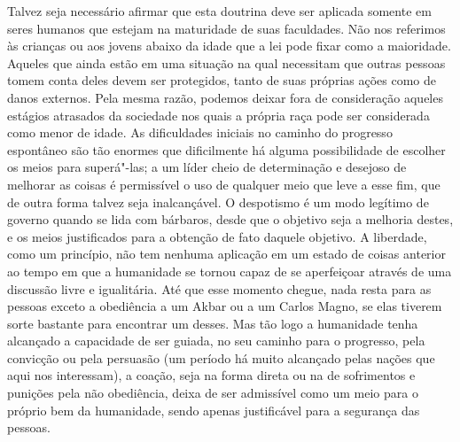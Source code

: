 Talvez seja necessário afirmar que esta doutrina deve ser
aplicada somente em seres humanos que estejam na maturidade de suas
faculdades. Não nos referimos às crianças ou aos jovens abaixo da idade
que a lei pode fixar como a maioridade. Aqueles que ainda estão
em uma situação na qual necessitam que outras pessoas tomem conta deles
devem ser protegidos, tanto de suas próprias ações como de danos
externos. Pela mesma razão, podemos deixar fora de consideração aqueles
estágios atrasados da sociedade nos quais a própria raça pode ser
considerada como menor de idade. As dificuldades iniciais no
caminho do progresso espontâneo são tão enormes que dificilmente há
alguma possibilidade de escolher os meios para superá"-las; a um
líder cheio de determinação e desejoso de melhorar as coisas é
permissível o uso de qualquer meio que leve a esse fim, que de outra
forma talvez seja inalcançável. O despotismo é um modo legítimo de
governo quando se lida com bárbaros, desde que o objetivo seja a
melhoria destes, e os meios justificados para a obtenção de fato daquele
objetivo. A liberdade, como um princípio, não tem nenhuma aplicação em
um estado de coisas anterior ao tempo em que a humanidade se tornou
capaz de se aperfeiçoar através de uma discussão livre e igualitária.
Até que esse momento chegue, nada resta para as pessoas exceto a
obediência a um Akbar ou a um Carlos Magno, se elas tiverem sorte
bastante para encontrar um desses. Mas tão logo a humanidade tenha
alcançado a capacidade de ser guiada, no seu caminho para o progresso,
pela convicção ou pela persuasão (um período há muito alcançado pelas
nações que aqui nos interessam), a coação, seja na forma direta ou na
de sofrimentos e punições pela não obediência, deixa de ser admissível
como um meio para o próprio bem da humanidade, sendo apenas
justificável para a segurança das pessoas. 

